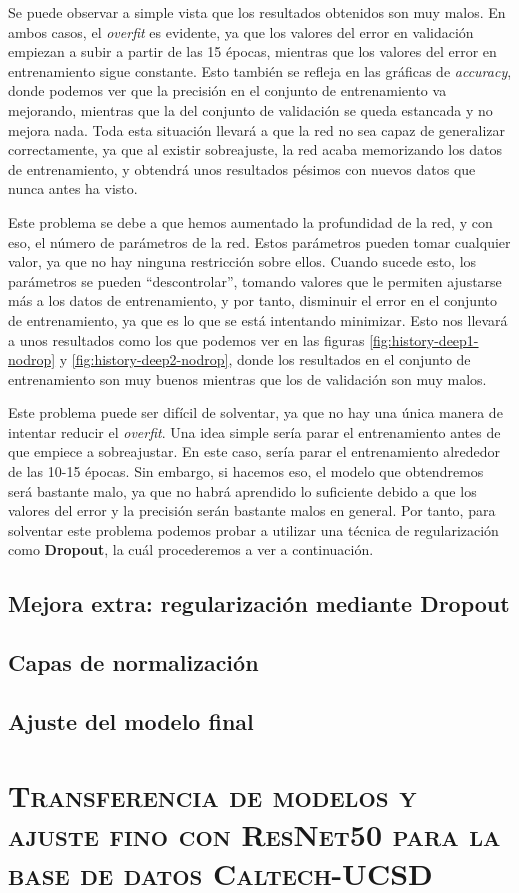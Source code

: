\documentclass[11pt,a4paper]{article}
\begin{document}
Se puede observar a simple vista que los resultados obtenidos son muy malos. En ambos casos, el \textit{overfit} es
evidente, ya que los valores del error en validación empiezan a subir a partir de las 15 épocas, mientras que los valores
del error en entrenamiento sigue constante. Esto también se refleja en las gráficas de \textit{accuracy}, donde podemos
ver que la precisión en el conjunto de entrenamiento va mejorando, mientras que la del conjunto de validación se queda
estancada y no mejora nada. Toda esta situación llevará a que la red no sea capaz de generalizar correctamente, ya que al
existir sobreajuste, la red acaba memorizando los datos de entrenamiento, y obtendrá unos resultados pésimos con nuevos
datos que nunca antes ha visto.

Este problema se debe a que hemos aumentado la profundidad de la red, y con eso, el número de parámetros de la red.
Estos parámetros pueden tomar cualquier valor, ya que no hay ninguna restricción sobre ellos.
Cuando sucede esto, los parámetros se pueden ``descontrolar'', tomando valores que le permiten ajustarse
más a los datos de entrenamiento, y por tanto, disminuir el error en el conjunto de entrenamiento, ya que es lo que
se está intentando minimizar. Esto nos llevará a unos resultados como los que podemos ver en las figuras
\ref{fig:history-deep1-nodrop} y \ref{fig:history-deep2-nodrop}, donde los resultados en el conjunto de entrenamiento
son muy buenos mientras que los de validación son muy malos.

Este problema puede ser difícil de solventar, ya que no hay una única manera de intentar reducir el \textit{overfit}.
Una idea simple sería parar el entrenamiento antes de que empiece a sobreajustar. En este caso, sería parar el entrenamiento
alrededor de las 10-15 épocas. Sin embargo, si hacemos eso, el modelo que obtendremos será bastante malo, ya que no habrá
aprendido lo suficiente debido a que los valores del error y la precisión serán bastante malos en general.
Por tanto, para solventar este problema podemos probar a utilizar una técnica de regularización como \textbf{Dropout}, la cuál
procederemos a ver a continuación.

\subsection{Mejora extra: regularización mediante Dropout}

\subsection{Capas de normalización}

\subsection{Ajuste del modelo final}

\section{\textsc{Transferencia de modelos y ajuste fino con ResNet50 para la base de datos Caltech-UCSD}}

\newpage



\end{document}
